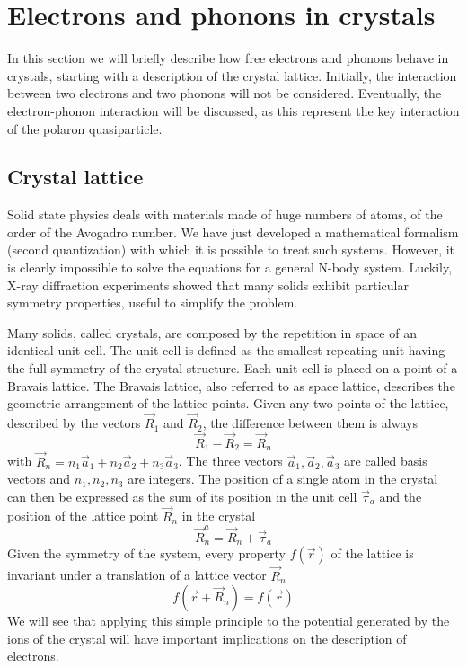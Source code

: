 \section{Electrons and phonons in crystals} \label{sec:electrons_phonons}
In this section we will briefly describe how free electrons and phonons behave in crystals, starting with a description of the crystal lattice. Initially, the interaction between two electrons and two phonons will not be considered. Eventually, the electron-phonon interaction will be discussed, as this represent the key interaction of the polaron quasiparticle.
\subsection{Crystal lattice} \label{sec:crystals}
Solid state physics deals with materials made of huge numbers of atoms, of the order of the Avogadro number. We have just developed a mathematical formalism (second quantization) with which it is possible to treat such systems. However, it is clearly impossible to solve the equations for a general N-body system. Luckily, X-ray diffraction experiments showed that many solids exhibit particular symmetry properties, useful to simplify the problem.

Many solids, called crystals, are composed by the repetition in space of an identical unit cell. The unit cell is defined as the smallest repeating unit having the full symmetry of the crystal structure. Each unit cell is placed on a point of a Bravais lattice. The Bravais lattice, also referred to as space lattice, describes the geometric arrangement of the lattice points. Given any two points of the lattice, described by the vectors $\vec{R}_1$ and $\vec{R}_2$, the difference between them is always
\begin{equation}
    \vec{R}_1 - \vec{R}_2 = \vec{R}_n
\end{equation}
with $\vec{R}_n = n_1\vec{a}_1 + n_2\vec{a}_2 + n_3\vec{a}_3$. The three vectors $\vec{a}_1, \vec{a}_2, \vec{a}_3$ are called basis vectors and $n_1, n_2, n_3$ are integers. The position of a single atom in the crystal can then be expressed as the sum of its position in the unit cell $\vec{\tau}_a$ and the position of the lattice point $\vec{R}_n$ in the crystal
\begin{equation}
    \vec{R}_n^a = \vec{R}_n + \vec{\tau}_a
\end{equation}
Given the symmetry of the system, every property $f(\vec{r})$ of the lattice is invariant under a translation of a lattice vector $\vec{R}_n$
\begin{equation} \label{eq:translational_invariance}
    f(\vec{r}+\vec{R}_n) = f(\vec{r})
\end{equation}
We will see that applying this simple principle to the potential generated by the ions of the crystal will have important implications on the description of electrons.

